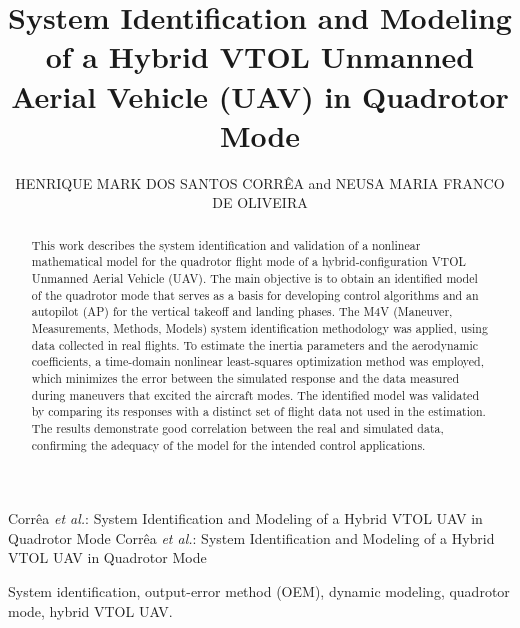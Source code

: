 \documentclass{ieeeaccess}
\begin{document}
\history{}
\doi{}

\title{System Identification and Modeling of a Hybrid VTOL Unmanned Aerial Vehicle (UAV) in Quadrotor Mode}

\author{\uppercase{Henrique Mark dos Santos Corrêa} and
\uppercase{Neusa Maria Franco de Oliveira}}

\address[1]{Department of Electronic Engineering (IEE), Instituto Tecnológico de Aeronáutica (ITA), São José dos Campos, SP 12228-900, Brazil (e-mail: henriquecorrea@ita.br; neusa@ita.br)}


\markboth
{Corrêa \MakeLowercase{\textit{et al.}}: System Identification and Modeling of a Hybrid VTOL UAV in Quadrotor Mode}
{Corrêa \MakeLowercase{\textit{et al.}}: System Identification and Modeling of a Hybrid VTOL UAV in Quadrotor Mode}


\begin{abstract}
This work describes the system identification and validation of a nonlinear mathematical model for the quadrotor flight mode of a hybrid-configuration VTOL Unmanned Aerial Vehicle (UAV). The main objective is to obtain an identified model of the quadrotor mode that serves as a basis for developing control algorithms and an autopilot (AP) for the vertical takeoff and landing phases. The M4V (Maneuver, Measurements, Methods, Models) system identification methodology was applied, using data collected in real flights. To estimate the inertia parameters and the aerodynamic coefficients, a time-domain nonlinear least-squares optimization method was employed, which minimizes the error between the simulated response and the data measured during maneuvers that excited the aircraft modes. The identified model was validated by comparing its responses with a distinct set of flight data not used in the estimation. The results demonstrate good correlation between the real and simulated data, confirming the adequacy of the model for the intended control applications.
\end{abstract}

\begin{keywords}
System identification, output-error method (OEM), dynamic modeling, quadrotor mode, hybrid VTOL UAV.
\end{keywords}
\end{document}
